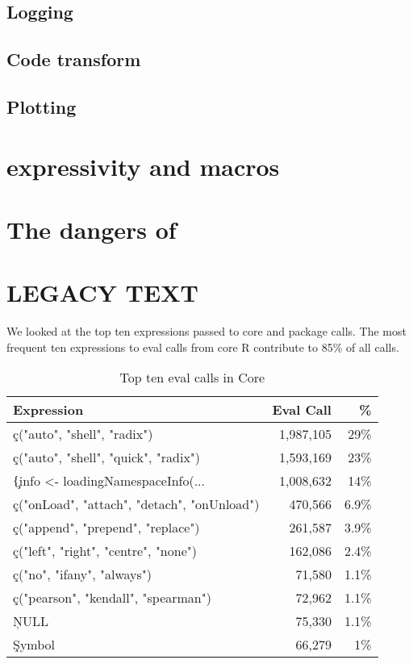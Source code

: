 \documentclass[acmsmall]{acmart}
\begin{document}
\subsection{Logging}

\subsection{Code transform}

\subsection{Plotting}

\section{\eval expressivity and macros}


\section{The dangers of \eval} \label{sec:dangerseval}

\section{LEGACY TEXT}

We looked at the top ten expressions passed to core and package \eval
calls. The most frequent ten expressions to eval calls from core R
contribute to 85\% of all \eval calls.

\begin{table}[!h] \centering
\begin{tabular}{@{}l|rr@{}} \hline
Expression & Eval Call &  \% \\\hline
\c{c("auto", "shell", "radix")} & 1,987,105 & 29\%\\
\c{c("auto", "shell", "quick", "radix")} & 1,593,169  & 23\%\\
\c{\{info <- loadingNamespaceInfo(...} & 1,008,632 &       14\%\\
\c{c("onLoad", "attach", "detach", "onUnload")}   & 470,566 &      6.9\%\\
\c{c("append", "prepend", "replace")} &              261,587&       3.9\% \\
\c{c("left", "right", "centre", "none")} & 162,086     & 2.4\%\\
\c{c("no", "ifany", "always")}   &                71,580 &       1.1\%\\
\c{c("pearson", "kendall", "spearman")}  & 72,962 &      1.1\%\\
\c{NULL}& 75,330  &      1.1\% \\
\c{Symbol}&                 66,279&       1\%\\\hline
\end{tabular}
\caption{Top ten eval calls in Core}\label{B}
\end{table}
\end{document}
